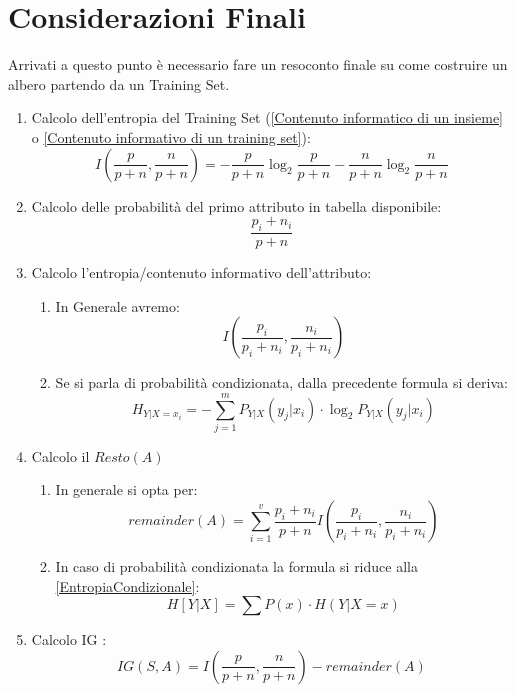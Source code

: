 \section{Considerazioni Finali}
Arrivati a questo punto è necessario fare un resoconto finale su come costruire un albero partendo da un Training Set.
\begin{enumerate}
    \item Calcolo dell'entropia del Training Set (\ref{Contenuto informatico di un insieme} o \ref{Contenuto informativo di un training set}):
    \[I\left(\frac{p}{p+n},\frac{n}{p+n}\right)=-\frac{p}{p+n}\log_2\frac{p}{p+n}
    -\frac{n}{p+n}\log_2\frac{n}{p+n}\]
    
    \item Calcolo delle probabilità del primo attributo in tabella disponibile:
    \[\frac{p_i+n_i}{p+n}\]

    \item Calcolo l'entropia/contenuto informativo dell'attributo:
        \begin{enumerate}
            \item In Generale avremo:
            \[I\left(\frac{p_i}{p_i+n_i},\frac{n_i}{p_i+n_i}\right)\]
            
            \item Se si parla di probabilità condizionata, dalla precedente formula si deriva:
            \[H_{Y|X=x_i}=-\sum_{j=1}^m P_{Y|X}(y_j|x_i)\cdot \log_2 P_{Y|X}(y_j|x_i)\]
        \end{enumerate}
    
    \item Calcolo il $Resto(A)$
        \begin{enumerate}
           \item In generale si opta per:
            \[remainder(A)=\sum_{i=1}^v \frac{p_i+n_i}{p+n}
  I\left(\frac{p_i}{p_i+n_i},\frac{n_i}{p_i+n_i}\right)\]
          
            \item In caso di probabilità condizionata la formula si riduce alla \ref{EntropiaCondizionale}:
                  \[H[Y|X]=\sum P(x)\cdot H(Y|X=x)\]
        \end{enumerate}
          
    \item Calcolo IG :
            \[IG(S,A)=I\left(\frac{p}{p+n},\frac{n}{p+n}\right)-remainder(A)\]
\end{enumerate}

